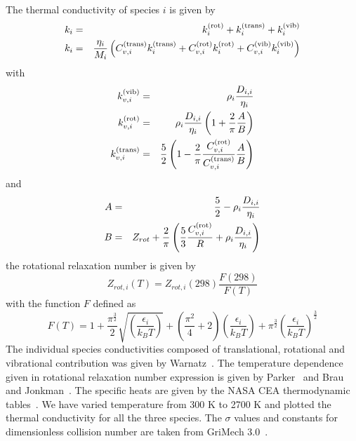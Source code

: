 The thermal conductivity of species $i$ is given by
\begin{eqnarray*}
k_i &=& k_i^{(\textnormal{rot})} + k_i^{(\textnormal{trans})} + k_i^{(\textnormal{vib})} \\
k_i &=& \frac{\eta_i}{M_i} \left(
                        C_{v,i}^{(\textnormal{trans})} k_i^{(\textnormal{trans})} + C_{v,i}^{(\textnormal{rot})} k_i^{(\textnormal{rot})}+ C_{v,i}^{(\textnormal{vib})}  k_i^{(\textnormal{vib})}
                                          \right)
\end{eqnarray*}
with
\begin{eqnarray*}
k_{v,i}^{(\textnormal{vib})}   & =& \rho_i \frac{D_{i,i}}{\eta_i} \\
k_{v,i}^{(\textnormal{rot})}   & =& \rho_i \frac{D_{i,i}}{\eta_i}\left(1 + \frac{2}{\pi}\frac{A}{B}\right) \\
k_{v,i}^{(\textnormal{trans})}   & =&  \frac{5}{2} \left(1 - \frac{2}{\pi}\frac{C_{v,i}^{(\textnormal{rot})}}{C_{v,i}^{(\textnormal{trans})}}\frac{A}{B}\right)
\end{eqnarray*}
%
and
%
\begin{eqnarray*}
  A & = & \frac{5}{2} -  \rho_i \frac{D_{i,i}}{\eta_i}  \\
  B & = & Z_{rot} + \frac{2}{\pi} \left(\frac{5}{3}\frac{C_{v,i}^{(\textnormal{rot})}}{R} + \rho_i \frac{D_{i,i}}{\eta_i}\right)
\end{eqnarray*}
%
 the rotational relaxation number is given by
\begin{equation}
Z_{rot,i}(T) = Z_{rot,i}(298)\frac{F(298)}{F(T)}
\label{thermal_cond:Zrot}
\end{equation}
 with the function $F$ defined as
\begin{equation}
F(T) = 1 + \frac{\pi^{\frac{3}{2}}}{2}\sqrt{\left(\frac{\epsilon_i}{k_B T}\right)}
         + \left(\frac{\pi^2}{4} + 2\right)\left(\frac{\epsilon_i}{k_B T}\right)
         + \pi^{\frac{3}{2}}\left(\frac{\epsilon_i}{k_B T}\right)^{\frac{3}{2}}
\end{equation}
%
The individual species conductivities composed of translational,
rotational and vibrational contribution was given by
Warnatz~\cite{Warnatz}. The temperature dependence given in rotational
relaxation number expression is given by Parker~\cite{Parker} and Brau
and Jonkman~\cite{Jonkman}. The specific heats are given by the NASA CEA
thermodynamic tables~\cite{CEATables}.  We have varied temperature from 300 K to 2700 K
and plotted the thermal conductivity for all the three
species. The $\sigma$ values and constants for dimensionless collision
number are taken from GriMech 3.0~\cite{gri}.

